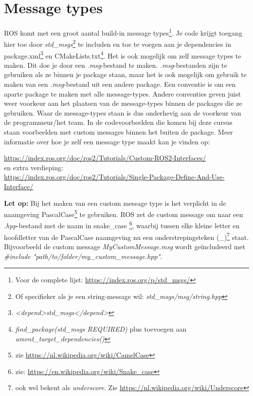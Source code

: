 \section{Message types}
\label{sec:message_types}
ROS komt met een groot aantal build-in message types\footnote{Voor de complete lijst: \url{https://index.ros.org/p/std_msgs/}}. Je code krijgt toegang hier toe door \textit{std\_msgs}\footnote{Of specifieker als je een string-message wil: \textit{std\_msgs/msg/string.hpp}} te includen en toe te voegen aan je dependencies in package.xml\footnote{\textit{<depend>std\_msgs</depend>}} en CMakeLists.txt\footnote{\textit{find\_package(std\_msgs REQUIRED)} plus toevoegen aan \textit{ament\_target\_dependencies()}}.
Het is ook mogelijk om zelf message types te maken. Dit doe je door een \textit{.msg}-bestand te maken. \textit{.msg}-bestanden zijn te gebruiken als ze binnen je package staan, maar het is ook mogelijk om gebruik te maken van een \textit{.msg}-bestand uit een andere package. Een conventie is om een aparte package te maken met alle message-types. Andere conventies geven juist weer voorkeur aan het plaatsen van de message-types binnen de packages die ze gebruiken. Waar de message-types staan is dus onderhevig aan de voorkeur van de programmeur/het team. In de codevoorbeelden die komen bij deze cursus staan voorbeelden met custom messages binnen het buiten de package. Meer informatie over hoe je zelf een message type maakt kan je vinden op:
\begin{center}
    {\footnotesize \url{https://index.ros.org/doc/ros2/Tutorials/Custom-ROS2-Interfaces/}}\\
    en extra verdieping: \\
    {\footnotesize \url{https://index.ros.org/doc/ros2/Tutorials/Single-Package-Define-And-Use-Interface/}}
\end{center}
\noindent \textbf{Let op:} Bij het maken van een custom message type is het verplicht in de naamgeving PascalCase\footnote{zie \url{https://nl.wikipedia.org/wiki/CamelCase}} te gebruiken. ROS zet de custom message om naar een \textit{.hpp}-bestand met de naam in snake\_case \footnote{zie: \url{https://en.wikipedia.org/wiki/Snake_case}}, waarbij tussen elke kleine letter en hoofdletter van de PascalCase naamgeving nu een onderstrepingsteken (\_)\footnote{ook wel bekent als \textit{underscore}. Zie \url{https://nl.wikipedia.org/wiki/Underscore}} staat. Bijvoorbeeld de custom message \textit{MyCustomMessage.msg} wordt geïncludeerd met \textit{\#include "path/to/folder/my\_custom\_message.hpp"}.

